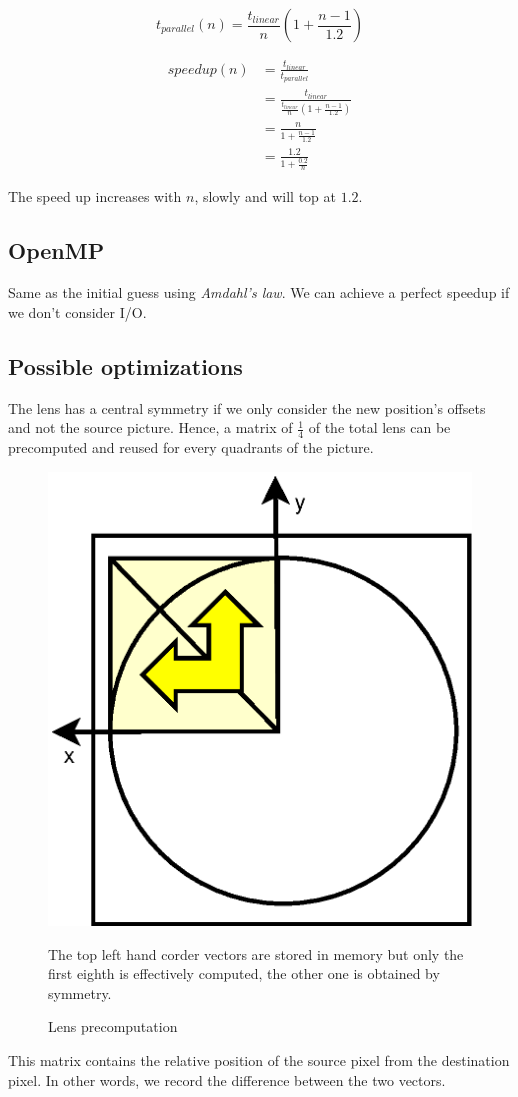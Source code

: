 \documentclass[10pt,a4paper]{article}
\begin{document}
$$t_{parallel}(n) = \frac{t_{linear}}{n}(1 + \frac{n - 1}{1.2})$$

\begin{align*}
speedup(n) &= \frac{t_{linear}}{t_{parallel}} \\
        &= \frac{t_{linear}}{\frac{t_{linear}}{n}(1 + \frac{n - 1}{1.2})} \\
        &= \frac{n}{1 + \frac{n - 1}{1.2}} \\
        &= \frac{1.2}{1 + \frac{0.2}{n}}
\end{align*}

The speed up increases with $n$, slowly and will top at $1.2$.

\subsection{OpenMP}
Same as the initial guess using \emph{Amdahl's law}. We can achieve a perfect
speedup if we don't consider I/O.

\subsection{Possible optimizations}
The lens has a central symmetry if we only consider the new position's offsets
and not the source picture. Hence, a matrix of $\frac{1}{4}$ of the total lens
can be precomputed and reused for every quadrants of the picture.

\begin{figure}[h]
    \centering
    \includegraphics[width=0.3\linewidth]{../figures/lens.eps}
    \caption{Lens precomputation}{The top left hand corder vectors are stored
    in memory but only the first eighth is effectively computed, the other one
    is obtained by symmetry.}
    \label{fig:lens}
\end{figure}

This matrix contains the relative position of the source pixel from the
destination pixel.  In other words, we record the difference between the two
vectors.
\end{document}
